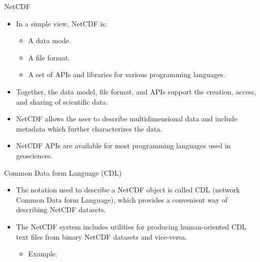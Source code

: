 \documentclass[compress,11pt,xcolor=svgnames,aspectratio=169]{beamer}
\begin{document}
\begin{frame}[t]{NetCDF}

\begin{itemize}
\setlength\itemsep{0.4cm}

\item In a simple view, NetCDF is:

    \begin{itemize}
        \item A data mode.
        \item A file format.
        \item A set of APIs and libraries for various programming languages.
    \end{itemize}

\item Together, the data model, file format, and APIs support the creation, access, and sharing of scientific data.

\item NetCDF allows the user to describe multidimensional data and include metadata which further characterizes the data.

\item NetCDF APIs are available for most programming languages used in geosciences.

\end{itemize}

\end{frame}

\begin{frame}[t]{Common Data form Language (CDL)}

\begin{itemize}
\setlength\itemsep{0.3cm}

\item The notation used to describe a NetCDF object is called CDL (network Common Data form Language), which provides a convenient way of describing NetCDF datasets.

\item The NetCDF system includes utilities for producing human-oriented CDL text files from binary NetCDF datasets and vice-versa.

    \begin{itemize}
        \item Example.
    \end{itemize}

\end{itemize}

\end{frame}
\end{document}

